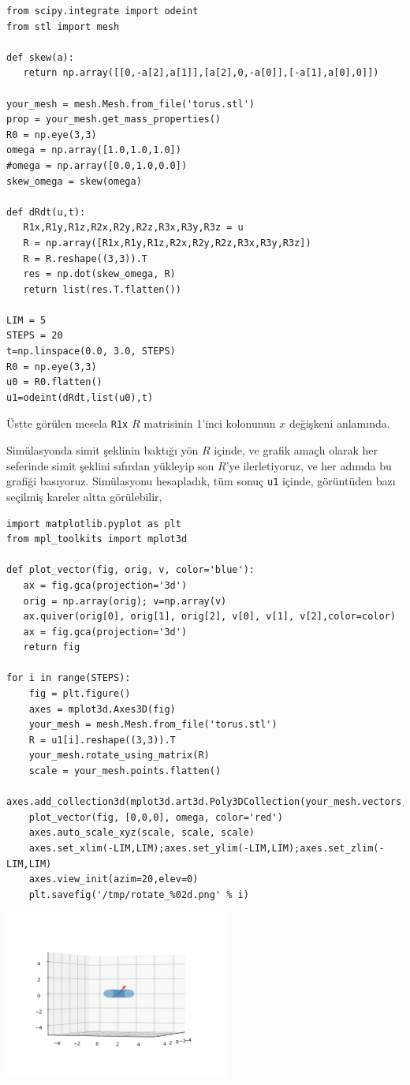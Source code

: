 \documentclass[12pt,fleqn]{article}\usepackage{../../common}
\begin{document}
\begin{verbatim}
from scipy.integrate import odeint
from stl import mesh

def skew(a):
   return np.array([[0,-a[2],a[1]],[a[2],0,-a[0]],[-a[1],a[0],0]])

your_mesh = mesh.Mesh.from_file('torus.stl')
prop = your_mesh.get_mass_properties()
R0 = np.eye(3,3)
omega = np.array([1.0,1.0,1.0])
#omega = np.array([0.0,1.0,0.0])
skew_omega = skew(omega)
   
def dRdt(u,t):   
   R1x,R1y,R1z,R2x,R2y,R2z,R3x,R3y,R3z = u
   R = np.array([R1x,R1y,R1z,R2x,R2y,R2z,R3x,R3y,R3z])
   R = R.reshape((3,3)).T
   res = np.dot(skew_omega, R)
   return list(res.T.flatten())

LIM = 5
STEPS = 20
t=np.linspace(0.0, 3.0, STEPS)
R0 = np.eye(3,3)
u0 = R0.flatten()
u1=odeint(dRdt,list(u0),t)
\end{verbatim}

Üstte görülen mesela \verb!R1x! $R$ matrisinin 1'inci kolonunun $x$ değişkeni
anlamında.

Simülasyonda simit şeklinin baktığı yön $R$ içinde, ve grafik amaçlı olarak her
seferinde simit şeklini sıfırdan yükleyip son $R$'ye ilerletiyoruz, ve her
adımda bu grafiği basıyoruz. Simülasyonu hesapladık, tüm sonuç \verb!u1!
içinde, görüntüden bazı seçilmiş kareler altta görülebilir,

\begin{verbatim}
import matplotlib.pyplot as plt
from mpl_toolkits import mplot3d

def plot_vector(fig, orig, v, color='blue'):
   ax = fig.gca(projection='3d')
   orig = np.array(orig); v=np.array(v)
   ax.quiver(orig[0], orig[1], orig[2], v[0], v[1], v[2],color=color)
   ax = fig.gca(projection='3d')  
   return fig

for i in range(STEPS):
    fig = plt.figure()
    axes = mplot3d.Axes3D(fig)
    your_mesh = mesh.Mesh.from_file('torus.stl')
    R = u1[i].reshape((3,3)).T
    your_mesh.rotate_using_matrix(R)
    scale = your_mesh.points.flatten()
    axes.add_collection3d(mplot3d.art3d.Poly3DCollection(your_mesh.vectors,alpha=0.3))
    plot_vector(fig, [0,0,0], omega, color='red')
    axes.auto_scale_xyz(scale, scale, scale)
    axes.set_xlim(-LIM,LIM);axes.set_ylim(-LIM,LIM);axes.set_zlim(-LIM,LIM)
    axes.view_init(azim=20,elev=0)
    plt.savefig('/tmp/rotate_%02d.png' % i)  
\end{verbatim}

\includegraphics[width=20em]{sim1/rotate_00.png}
\end{document}
